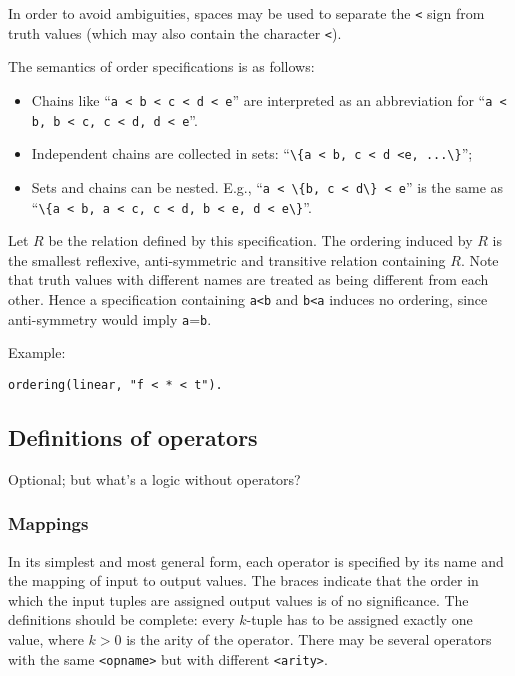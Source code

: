 \documentclass[
]{article}
\newcommand{\passthrough}[1]{#1}
\providecommand{\tightlist}{%
  \setlength{\itemsep}{0pt}\setlength{\parskip}{0pt}}
\begin{document}
In order to avoid ambiguities, spaces may be used to separate the
\passthrough{\lstinline!<!} sign from truth values (which may also
contain the character \passthrough{\lstinline!<!}).

The semantics of order specifications is as follows:

\begin{itemize}
\tightlist
\item
  Chains like ``\passthrough{\lstinline!a < b < c < d < e!}'' are
  interpreted as an abbreviation for
  ``\passthrough{\lstinline!a < b, b < c, c < d, d < e!}''.
\item
  Independent chains are collected in sets:
  ``\passthrough{\lstinline!\{a < b, c < d <e, ...\}!}'';
\item
  Sets and chains can be nested. E.g.,
  ``\passthrough{\lstinline!a < \{b, c < d\} < e!}'' is the same as
  ``\passthrough{\lstinline!\{a < b, a < c, c < d, b < e, d < e\}!}''.
\end{itemize}

Let \(R\) be the relation defined by this specification. The ordering
induced by \(R\) is the smallest reflexive, anti-symmetric and
transitive relation containing \(R\). Note that truth values with
different names are treated as being different from each other. Hence a
specification containing \passthrough{\lstinline!a<b!} and
\passthrough{\lstinline!b<a!} induces no ordering, since anti-symmetry
would imply \passthrough{\lstinline!a!}=\passthrough{\lstinline!b!}.

Example:

\begin{lstlisting}
ordering(linear, "f < * < t").
\end{lstlisting}

\hypertarget{definitions-of-operators}{%
\subsection{Definitions of operators}\label{definitions-of-operators}}

Optional; but what's a logic without operators?

\hypertarget{mappings}{%
\subsubsection{Mappings}\label{mappings}}

In its simplest and most general form, each operator is specified by its
name and the mapping of input to output values. The braces indicate that
the order in which the input tuples are assigned output values is of no
significance. The definitions should be complete: every \(k\)-tuple has
to be assigned exactly one value, where \(k>0\) is the arity of the
operator. There may be several operators with the same
\passthrough{\lstinline!<opname>!} but with different
\passthrough{\lstinline!<arity>!}.
\end{document}
